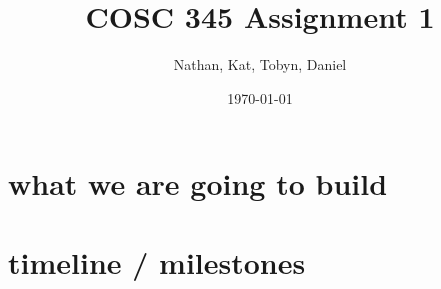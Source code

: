 \documentclass[11pt, oneside]{article}   	%
\title{COSC 345 Assignment 1}
\author{Nathan, Kat, Tobyn, Daniel}
\date{\today}							%
\begin{document}
\maketitle
\section{what we are going to build}

\section{timeline / milestones}
\end{document}
